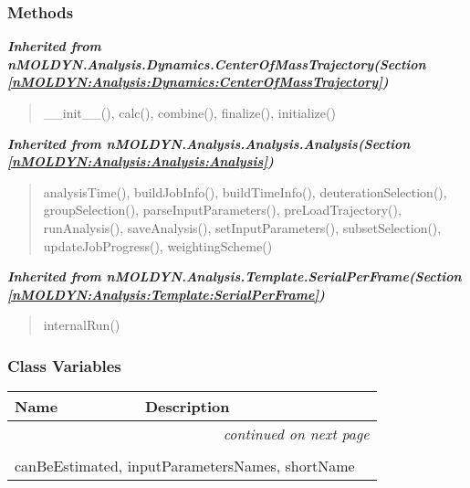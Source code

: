 
  \subsubsection{Methods}


\large{\textbf{\textit{Inherited from nMOLDYN.Analysis.Dynamics.CenterOfMassTrajectory\textit{(Section \ref{nMOLDYN:Analysis:Dynamics:CenterOfMassTrajectory})}}}}

\begin{quote}
\_\_init\_\_(), calc(), combine(), finalize(), initialize()
\end{quote}

\large{\textbf{\textit{Inherited from nMOLDYN.Analysis.Analysis.Analysis\textit{(Section \ref{nMOLDYN:Analysis:Analysis:Analysis})}}}}

\begin{quote}
analysisTime(), buildJobInfo(), buildTimeInfo(), deuterationSelection(), groupSelection(), parseInputParameters(), preLoadTrajectory(), runAnalysis(), saveAnalysis(), setInputParameters(), subsetSelection(), updateJobProgress(), weightingScheme()
\end{quote}

\large{\textbf{\textit{Inherited from nMOLDYN.Analysis.Template.SerialPerFrame\textit{(Section \ref{nMOLDYN:Analysis:Template:SerialPerFrame})}}}}

\begin{quote}
internalRun()
\end{quote}


  \subsubsection{Class Variables}

    \vspace{-1cm}
\hspace{\varindent}\begin{longtable}{|p{\varnamewidth}|p{\vardescrwidth}|l}
\cline{1-2}
\cline{1-2} \centering \textbf{Name} & \centering \textbf{Description}& \\
\cline{1-2}
\endhead\cline{1-2}\multicolumn{3}{r}{\small\textit{continued on next page}}\\\endfoot\cline{1-2}
\endlastfoot\multicolumn{2}{|l|}{\textit{Inherited from nMOLDYN.Analysis.Dynamics.CenterOfMassTrajectory \textit{(Section \ref{nMOLDYN:Analysis:Dynamics:CenterOfMassTrajectory})}}}\\
\multicolumn{2}{|p{\varwidth}|}{\raggedright canBeEstimated, inputParametersNames, shortName}\\
\cline{1-2}
\end{longtable}

